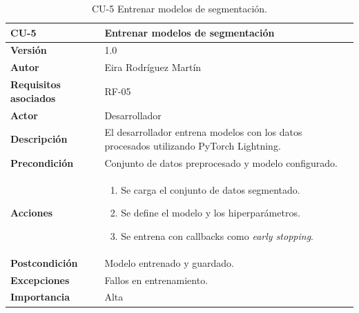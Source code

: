 \begin{table}[!h]
	\centering
	\begin{tabularx}{\linewidth}{ p{} p{} }
		\toprule
		\textbf{CU-5}    & \textbf{Entrenar modelos de segmentación}\\
		\toprule
		\textbf{Versión}              & 1.0    \\
		\textbf{Autor}                & Eira Rodríguez Martín \\
		\textbf{Requisitos asociados} & RF-05 \\
        \textbf{Actor}                & Desarrollador \\
		\textbf{Descripción}          & El desarrollador entrena modelos con los datos procesados utilizando PyTorch Lightning.\\
		\textbf{Precondición}         & Conjunto de datos preprocesado y modelo configurado. \\
		\textbf{Acciones}             &
		\begin{enumerate}
			\def\labelenumi{\arabic{enumi}.}
			\tightlist
			\item Se carga el conjunto de datos segmentado.
			\item Se define el modelo y los hiperparámetros.
            \item Se entrena con callbacks como \textit{early stopping}.
		\end{enumerate}\\
		\textbf{Postcondición}        & Modelo entrenado y guardado. \\
		\textbf{Excepciones}          & Fallos en entrenamiento. \\
		\textbf{Importancia}          & Alta \\
		\bottomrule
	\end{tabularx}
	\caption{CU-5 Entrenar modelos de segmentación.}
\end{table}

